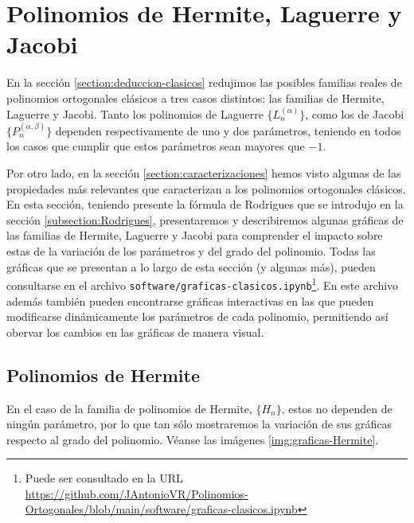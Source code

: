 \section{Polinomios de Hermite, Laguerre y Jacobi}

En la sección \ref{section:deduccion-clasicos} redujimos las posibles familias reales de polinomios ortogonales clásicos a tres casos distintos: las familias de Hermite, Laguerre y Jacobi. Tanto los polinomios de Laguerre $\{L_n^{(\alpha)}\}$, como los de Jacobi $\{P_n^{(\alpha,\beta)}\}$ dependen respectivamente de uno y dos parámetros, teniendo en todos los casos que cumplir que estos parámetros sean mayores que $-1$. 

Por otro lado, en la sección \ref{section:caracterizaciones} hemos visto algunas de las propiedades más relevantes que caracterizan a los polinomios ortogonales clásicos. En esta sección, teniendo presente la fórmula de Rodrigues que se introdujo en la sección \ref{subsection:Rodrigues}, presentaremos y describiremos algunas gráficas de las familias de Hermite, Laguerre y Jacobi para comprender el impacto sobre estas de la variación de los parámetros y del grado del polinomio. Todas las gráficas que se presentan a lo largo de esta sección (y algunas más), pueden consultarse en el archivo \texttt{software/graficas-clasicos.ipynb}\footnote{Puede ser consultado en la URL \url{https://github.com/JAntonioVR/Polinomios-Ortogonales/blob/main/software/graficas-clasicos.ipynb}}. En este archivo además también pueden encontrarse gráficas interactivas en las que pueden modificarse dinámicamente los parámetros de cada polinomio, permitiendo así obervar los cambios en las gráficas de manera visual.

\subsection{Polinomios de Hermite}

En el caso de la familia de polinomios de Hermite, $\{H_n\}$, estos no dependen de ningún parámetro, por lo que tan sólo mostraremos la variación de sus gráficas respecto al grado del polinomio. Véanse las imágenes \ref{img:graficas-Hermite}.

